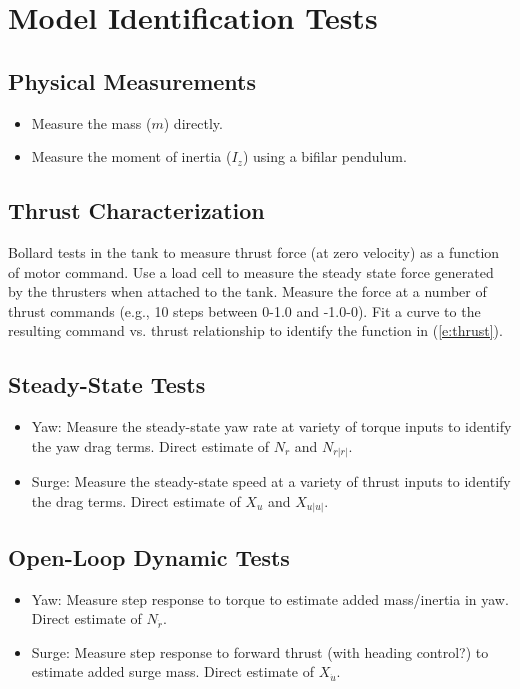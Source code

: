 \documentclass[11pt,draftcls,journal,onecolumn]{../latexlib/latex_ieee/IEEEtran}
\begin{document}
\section{Model Identification Tests}
\subsection{Physical Measurements}
\begin{itemize}
\item Measure the mass ($m$) directly.  
\item Measure the moment of inertia ($I_z$) using a bifilar pendulum.
\end{itemize}

\subsection{Thrust Characterization}
Bollard tests in the tank to measure thrust force (at zero velocity) as a function of motor command.  Use a load cell to measure the steady state force generated by the thrusters when attached to the tank.  Measure the force at a number of thrust commands (e.g., 10 steps between 0-1.0 and -1.0-0).  Fit a curve to the resulting command vs. thrust relationship to identify the function in (\ref{e:thrust}).

\subsection{Steady-State Tests}
\begin{itemize}
\item Yaw: Measure the steady-state yaw rate at variety of torque inputs to identify the yaw drag terms. Direct estimate of $N_r$ and $N_{r|r|}$.
\item Surge: Measure the steady-state speed at a variety of thrust inputs to identify the drag terms. Direct estimate of $X_u$ and $X_{u|u|}$.
\end{itemize}


\subsection{Open-Loop Dynamic Tests}
\begin{itemize}
\item Yaw: Measure step response to torque to estimate added mass/inertia in yaw.  Direct estimate of $N_{\dot{r}}$.
\item Surge: Measure step response to forward thrust (with heading control?) to estimate added surge mass. Direct estimate of $X_{\dot{u}}$.
\end{itemize}
\end{document}
